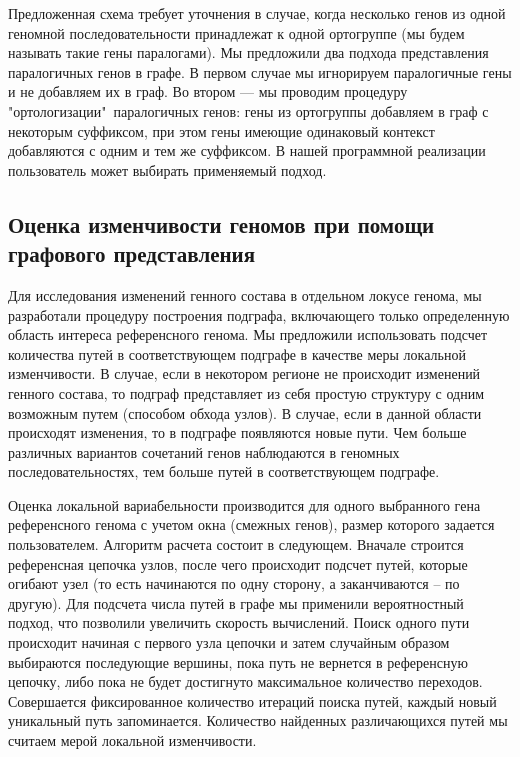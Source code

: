 Предложенная схема требует уточнения в случае, когда несколько генов из одной геномной последовательности принадлежат к одной ортогруппе (мы будем называть такие гены паралогами). Мы предложили два подхода представления паралогичных генов в графе. В первом случае мы игнорируем паралогичные гены и не добавляем их в граф. Во втором --- мы проводим процедуру "ортологизации"\ паралогичных генов: гены из ортогруппы добавляем в граф с некоторым суффиксом, при этом гены имеющие одинаковый контекст добавляются с одним и тем же суффиксом. В нашей программной реализации пользователь может выбирать применяемый подход. 

\subsection*{Оценка изменчивости геномов при помощи графового представления}

Для исследования изменений генного состава в отдельном локусе генома, мы разработали процедуру построения подграфа, включающего только определенную область интереса референсного генома. Мы предложили использовать подсчет количества путей в соответствующем подграфе в качестве меры локальной изменчивости. В случае, если в некотором регионе не происходит изменений генного состава, то подграф представляет из себя простую структуру с одним возможным путем (способом обхода узлов). В случае, если в данной области происходят изменения, то в подграфе появляются новые пути. Чем больше различных вариантов сочетаний генов наблюдаются в геномных последовательностях, тем больше путей в соответствующем подграфе. 

Оценка локальной вариабельности производится для одного выбранного гена референсного генома с учетом окна (смежных генов), размер которого задается пользователем. Алгоритм расчета состоит в следующем. Вначале строится референсная цепочка узлов, после чего происходит подсчет путей, которые огибают узел (то есть начинаются по одну сторону, а заканчиваются -- по другую). Для подсчета числа путей в графе мы применили вероятностный подход, что позволили увеличить скорость вычислений. Поиск одного пути происходит начиная с первого узла цепочки и затем  случайным образом выбираются последующие вершины, пока путь не вернется в референсную цепочку, либо пока не будет достигнуто максимальное количество переходов. Совершается фиксированное количество итераций поиска путей, каждый новый уникальный путь запоминается. Количество найденных различающихся путей мы считаем мерой локальной изменчивости.

